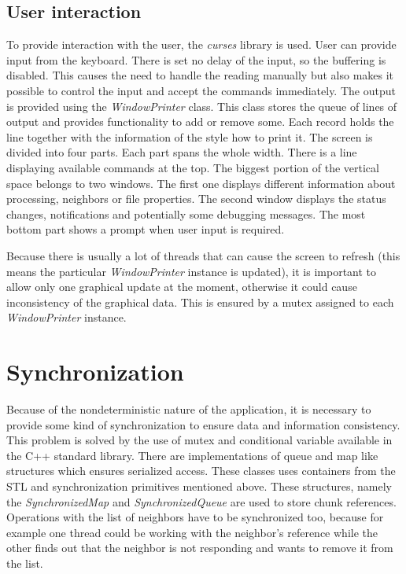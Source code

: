 \subsection*{User interaction}

To provide interaction with the user, the \textit{curses} library is
used. User can provide input from the keyboard. There is set no delay of
the input, so the buffering is disabled. This causes the need to handle
the reading manually but also makes it possible to control the input and
accept the commands immediately. The output is provided using the
\textit{WindowPrinter} class. This class stores the queue of lines of
output and provides functionality to add or remove some. Each record
holds the line together with the information of the style how to print
it. The screen is divided into four parts. Each part spans the whole
width. There is a line displaying available commands at the top. The
biggest portion of the vertical space belongs to two windows. The first
one displays different information about processing, neighbors or file
properties. The second window displays the status changes, notifications
and potentially some debugging messages. The most bottom part shows a
prompt when user input is required.

Because there is usually a lot of threads that can cause the screen to
refresh (this means the particular \textit{WindowPrinter} instance is
updated), it is important to allow only one graphical update at the
moment, otherwise it could cause inconsistency of the graphical data.
This is ensured by a mutex assigned to each \textit{WindowPrinter}
instance.

\section{Synchronization}\label{synchronization}

Because of the nondeterministic nature of the application, it is
necessary to provide some kind of synchronization to ensure data and
information consistency. This problem is solved by the use of mutex and
conditional variable available in the C++ standard library. There are
implementations of queue and map like structures which ensures
serialized access. These classes uses containers from the STL and
synchronization primitives mentioned above. These structures, namely the
\textit{SynchronizedMap} and \textit{SynchronizedQueue} are used to
store chunk references. Operations with the list of neighbors have to be
synchronized too, because for example one thread could be working with
the neighbor's reference while the other finds out that the neighbor is
not responding and wants to remove it from the list.


